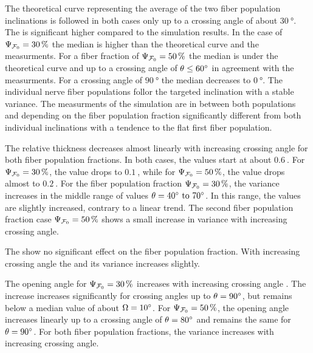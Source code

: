 The theoretical curve representing the average of the two fiber population inclinations is followed in both cases only up to a crossing angle of about $\SI{30}{\degree}$.
The \bvariance{} is significant higher compared to the simulation results.
In the case of $\textnormal{$\Psi_{\textnormal{$\mathcal{F}_0$}}$}=\SI{30}{\percent}$ the median is higher than the theoretical curve and the measurments.
For a fiber fraction of $\textnormal{$\Psi_{\textnormal{$\mathcal{F}_0$}}$}=\SI{50}{\percent}$ the median is under the theoretical curve and up to a crossing angle of $\textnormal{$\theta$} \leq \SI{60}{\degree}$ in agreement with the measurments.
For a crossing angle of $\SI{90}{\degree}$ the median decreases to $\SI{0}{\degree}$.
The individual nerve fiber populations follor the targeted inclination with a stable \bvariance{} variance.
The measurments of the simulation are in between both populations and depending on the fiber population fraction \modelPsi{} significantly different from both individual inclinations with a tendence to the flat first fiber population.
\par
The relative thickness \trel{} decreases almost linearly with increasing crossing angle \modelOmega{} for both fiber population fractions.
In both cases, the \trel{} values start at about $\SI{0.6}{}$.
For $\textnormal{$\Psi_{\textnormal{$\mathcal{F}_0$}}$} = \SI{30}{\percent}$, the \trel{} value drops to $\SI{0.1}{}$, while for $\textnormal{$\Psi_{\textnormal{$\mathcal{F}_0$}}$} = \SI{50}{\percent}$, the \trel{} value drops almost to $\SI{0.2}{}$.
For the fiber population fraction $\textnormal{$\Psi_{\textnormal{$\mathcal{F}_0$}}$} = \SI{30}{\percent}$, the variance increases in the middle range of values $\modelOmega=\SIrange{40}{70}{\degree}$.
In this range, the \trel{} values are slightly increased, contrary to a linear trend.
The second fiber population fraction case $\textnormal{$\Psi_{\textnormal{$\mathcal{F}_0$}}$} = \SI{50}{\percent}$ shows a small increase in variance with increasing crossing angle.
\par
The \rvalue{} show no significant effect on the fiber population fraction. 
With increasing crossing angle \modelOmega{} the \rvalue{} and its variance increases slightly.
\par
The opening angle \openingAngle{} for $\textnormal{$\Psi_{\textnormal{$\mathcal{F}_0$}}$}=\SI{30}{\percent}$ increases with increasing crossing angle \modelOmega{}.
The increase increases significantly for crossing angles up to $\textnormal{$\theta$}=\SI{90}{\degree}$, but remains below a median value of about $\textnormal{$\Omega$}=\SI{10}{\degree}$.
For $\textnormal{$\Psi_{\textnormal{$\mathcal{F}_0$}}$}=\SI{50}{\percent}$, the opening angle increases linearly up to a crossing angle of $\textnormal{$\theta$}=\SI{80}{\degree}$ and remains the same for $\textnormal{$\theta$}=\SI{90}{\degree}$.
For both fiber population fractions, the variance increases with increasing crossing angle.
